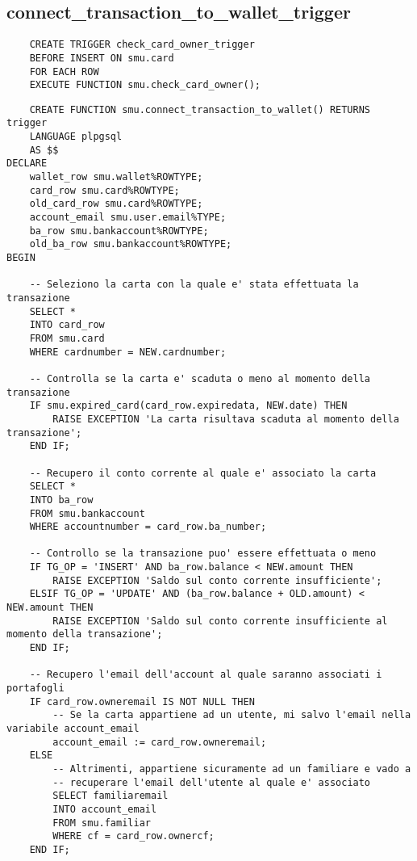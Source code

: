 \subsection{connect\_transaction\_to\_wallet\_trigger}

\begin{lstlisting}
    CREATE TRIGGER check_card_owner_trigger 
    BEFORE INSERT ON smu.card 
    FOR EACH ROW 
    EXECUTE FUNCTION smu.check_card_owner();
\end{lstlisting}

\begin{lstlisting}
    CREATE FUNCTION smu.connect_transaction_to_wallet() RETURNS trigger
    LANGUAGE plpgsql
    AS $$
DECLARE
    wallet_row smu.wallet%ROWTYPE;
    card_row smu.card%ROWTYPE;
    old_card_row smu.card%ROWTYPE;
    account_email smu.user.email%TYPE;
    ba_row smu.bankaccount%ROWTYPE;
    old_ba_row smu.bankaccount%ROWTYPE;
BEGIN

    -- Seleziono la carta con la quale e' stata effettuata la transazione
    SELECT *
    INTO card_row
    FROM smu.card
    WHERE cardnumber = NEW.cardnumber;

    -- Controlla se la carta e' scaduta o meno al momento della transazione
    IF smu.expired_card(card_row.expiredata, NEW.date) THEN
        RAISE EXCEPTION 'La carta risultava scaduta al momento della transazione';
    END IF;

    -- Recupero il conto corrente al quale e' associato la carta
    SELECT *
    INTO ba_row
    FROM smu.bankaccount
    WHERE accountnumber = card_row.ba_number;
    
    -- Controllo se la transazione puo' essere effettuata o meno
    IF TG_OP = 'INSERT' AND ba_row.balance < NEW.amount THEN
        RAISE EXCEPTION 'Saldo sul conto corrente insufficiente';
    ELSIF TG_OP = 'UPDATE' AND (ba_row.balance + OLD.amount) < NEW.amount THEN
        RAISE EXCEPTION 'Saldo sul conto corrente insufficiente al momento della transazione';
    END IF;

    -- Recupero l'email dell'account al quale saranno associati i portafogli
    IF card_row.owneremail IS NOT NULL THEN
        -- Se la carta appartiene ad un utente, mi salvo l'email nella variabile account_email
        account_email := card_row.owneremail;
    ELSE
        -- Altrimenti, appartiene sicuramente ad un familiare e vado a
        -- recuperare l'email dell'utente al quale e' associato
        SELECT familiaremail
        INTO account_email
        FROM smu.familiar
        WHERE cf = card_row.ownercf;
    END IF;


\end{lstlisting}
